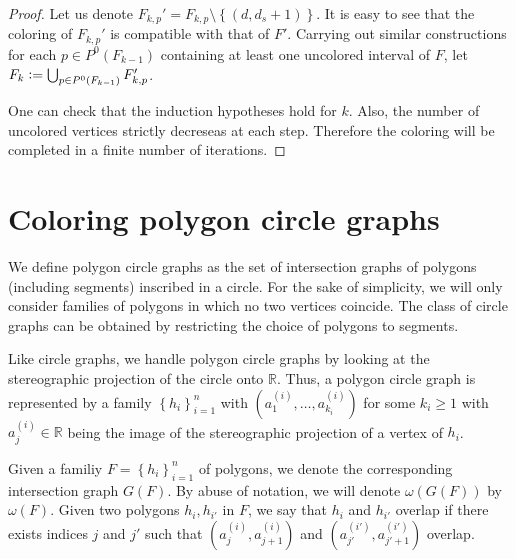 \documentclass[12pt]{article}
\theoremstyle{definition}
\newcommand{\defeq}{\vcentcolon=}
\begin{document}
\begin{proof}
        Let us denote $F_{k, p}' = 
        F_{k, p} \setminus \left\{
        \left(d, d_{s} + 1\right)\right\}$.
        It is easy to see that the coloring of
        $F_{k, p}'$ is compatible
        with that of
        $F'$.
        Carrying out similar constructions
        for each $p \in P^{0}\left(F_{k-1}\right)$
        containing at least one uncolored
        interval of $F$, let
        $F_{k} \defeq \bigcup_{p \in 
        P^{0}\left(F_{k-1}\right)} F_{k, p}'$.

        One can check that the 
        induction hypotheses hold
        for $k$.
        Also, the number of uncolored
        vertices strictly decreseas 
        at each step. Therefore
        the coloring will be 
        completed in a finite
        number of iterations.
    \end{proof}
    
    \section{Coloring polygon circle graphs}

    We define polygon circle
    graphs as the set of intersection
    graphs of polygons
    (including segments)
    inscribed in a circle.
    For the sake of simplicity,
    we will only consider
    families of polygons
    in which no two
    vertices coincide.
    The class of circle
    graphs can be obtained
    by restricting the
    choice of polygons
    to segments.

    Like circle graphs, we
    handle polygon
    circle graphs by looking
    at the stereographic projection
    of the circle onto $\mathbb{R}$.
    Thus, a polygon circle
    graph is represented by a 
    family $\left\{h_{i}\right\}_{i=1}^{n}$
    with 
    $\left(a_{1}^{\left(i\right)},
    \ldots, a_{k_{i}}^{\left(i\right)}\right)$ 
    for some $k_{i} \geq 1$ 
    with $a^{\left(i\right)}_{j} \in \mathbb{R}$
    being the image of
    the stereographic projection
    of a vertex of $h_{i}$.

    Given a familiy
    $F = \left\{h_{i}\right\}_{i=1}^{n}$ 
    of polygons, we denote
    the corresponding
    intersection graph $G\left(F\right)$.
    By abuse of notation,
    we will denote
    $\omega\left(G\left(F\right)\right)$ 
    by $\omega\left(F\right)$.
    Given two polygons
    $h_{i}, h_{i'}$ in $F$,
    we say that $h_{i}$ and
    $h_{i'}$ overlap 
    if there exists indices 
    $j$ and $j'$ such that
    $\left(a_{j}^{\left(i\right)},
     a_{j+1}^{\left(i\right)}\right)$ 
     and $\left(a_{j'}^{\left(i'\right)},
     a_{j'+1}^{\left(i'\right)}\right)$ 
     overlap.
\end{document}
